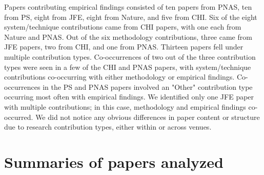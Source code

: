 Papers contributing empirical findings consisted of ten papers from PNAS, ten from
PS, eight from JFE, eight from Nature, and five from CHI. Six of the eight
system/technique contributions came from CHI papers, with one each from Nature and PNAS.
Out of the six methodology contributions, three came from JFE papers, two from
CHI, and one from PNAS. Thirteen papers fell under multiple contribution types.
Co-occurrences of two out of the three contribution types were seen in a few of
the CHI and PNAS papers, with system/technique contributions co-occurring
with either methodology or empirical findings. Co-occurrences in the PS and PNAS
papers involved an "Other" contribution type occurring most often with empirical
findings. We identified only one JFE paper with multiple contributions; in this
case, methodology and empirical findings co-occurred. We did not notice any
obvious differences in paper content or structure due to research contribution
types, either within or across venues.

\clearpage
\section{Summaries of papers analyzed}
\tableContributions